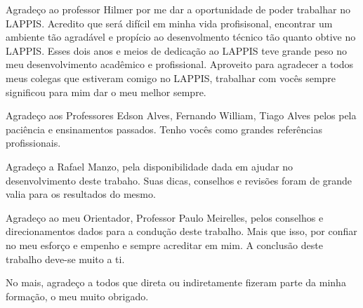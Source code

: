 \begin{agradecimentos}
Agradeço ao professor Hilmer por me dar a oportunidade de poder trabalhar no LAPPIS. Acredito que será difícil em minha vida profisisonal, encontrar um ambiente tão agradável e propício ao desenvolmento técnico tão quanto obtive no LAPPIS. Esses dois anos e meios de dedicação ao LAPPIS teve grande peso no meu desenvolvimento acadêmico e profissional. Aproveito para agradecer a todos meus colegas que estiveram comigo no LAPPIS, trabalhar com vocês sempre significou para mim dar o meu melhor sempre.

Agradeço aos Professores Edson Alves, Fernando William, Tiago Alves pelos pela paciência e ensinamentos passados. Tenho vocês como grandes referências profissionais.   

Agradeço a Rafael Manzo, pela disponibilidade dada em ajudar no desenvolvimento deste trabaho. Suas dicas, conselhos e revisões foram de grande valia para os resultados do mesmo.

Agradeço ao meu Orientador, Professor Paulo Meirelles, pelos conselhos e direcionamentos dados para a condução deste trabalho. Mais que isso, por confiar no meu esforço e empenho e sempre acreditar em mim. A conclusão deste trabalho deve-se muito a ti.  

No mais, agradeço a todos que direta ou indiretamente fizeram parte da minha formação, o meu muito obrigado.



\end{agradecimentos}
